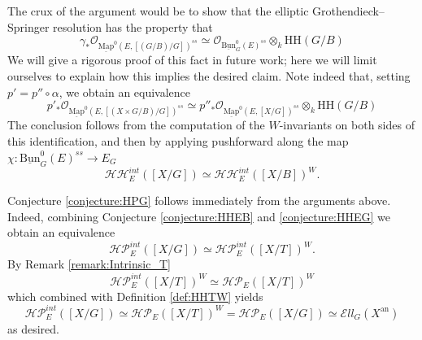 \documentclass[11pt,letterpaper]{amsart}
\newtheorem{remark}[dummy]{Remark}
\newcommand{\mHH}{\mathrm{HH}}
\newcommand{\bZ}{\mathbb{Z}}
\newcommand{\cO}{\mathcal{O}}
\newcommand{\cHH}{\mathcal{HH}}
\newcommand{\cHP}{\mathcal{HP}}
\newcommand{\Mapo}[2]{\underline{\mathrm{Map}}^{0}\left (#1,#2\right )}
\newcommand{\Bun}{\underline{\mathrm{Bun}}}
\newcommand{\El}{\mathcal{E}ll}
\newcommand{\an}{\mathrm{an}}
\begin{document}
The crux of the argument would be to show that the elliptic Grothendieck--Springer resolution has the property that %
$$\gamma_\ast\cO_{\Mapo{E}{[(G/B)/G]}^{ss}}\simeq\cO_{\Bun^{0}_G(E)^{ss}}\otimes_{k} \mHH(G/B)$$
We  will give a rigorous proof of this fact in future work; here we will limit ourselves to explain how this implies the desired claim. Note indeed that, setting   $p'=p''\circ\alpha$, we obtain an  equivalence
$$p'_\ast\cO_{\Mapo{E}{[(X\times G/B)/G]}^{ss}}\simeq p''_\ast\cO_{\Mapo{E}{[X/G]}^{ss}}\otimes_{k}\mHH(G/B)$$
The conclusion follows from the computation of the $W$-invariants on both sides of this identification, and then by applying pushforward along the map $\chi : \Bun^{0}_G(E)^{ss}\to E_G$ 
$$\cHH_E^{int}([X/G])\simeq\cHH_E^{int}([X/B])^W.$$


 Conjecture \ref{conjecture:HPG}  follows immediately from the arguments above. Indeed, 
combining Conjecture \ref{conjecture:HHEB} and  \ref{conjecture:HHEG} we obtain an equivalence
$$\cHP_E^{int}([X/G])\simeq\cHP_E^{int}([X/T])^W.$$
By Remark \ref{remark:Intrinsic_T}
$$\cHP_E^{int}([X/T])^W\simeq\cHP_E([X/T])^W$$
which combined with Definition \ref{def:HHTW} yields
$$\cHP_E^{int}([X/G])\simeq\cHP_E([X/T])^W=\cHP_E([X/G])\simeq\El_G(X^\an)$$
as desired. 

\end{document}
